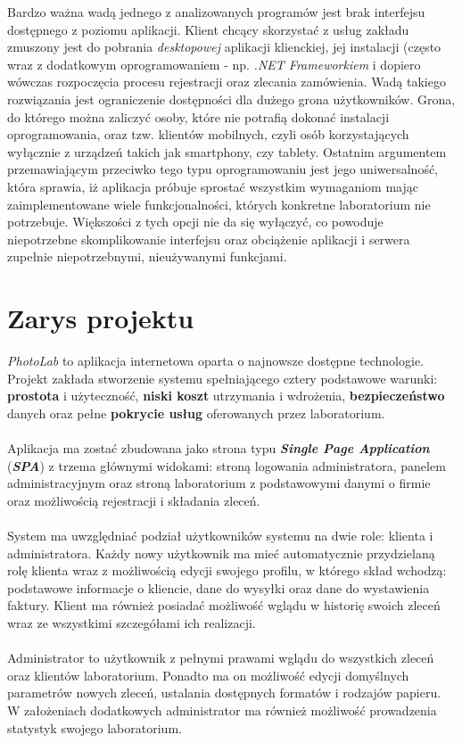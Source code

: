 Bardzo ważna wadą jednego z analizowanych programów jest brak interfejsu dostępnego z poziomu aplikacji. Klient chcący skorzystać z usług zakładu zmuszony jest do pobrania \textit{desktopowej} aplikacji klienckiej, jej instalacji (często wraz z dodatkowym oprogramowaniem - np. \textit{.NET Frameworkiem} i dopiero wówczas rozpoczęcia procesu rejestracji oraz zlecania zamówienia. Wadą takiego rozwiązania jest ograniczenie dostępności dla dużego grona użytkowników. Grona, do którego można zaliczyć osoby, które nie potrafią dokonać instalacji oprogramowania, oraz tzw. klientów mobilnych, czyli osób korzystających wyłącznie z urządzeń takich jak smartphony, czy tablety. Ostatnim argumentem przemawiającym przeciwko tego typu oprogramowaniu jest jego uniwersalność, która sprawia, iż aplikacja próbuje sprostać wszystkim wymaganiom mając zaimplementowane wiele funkcjonalności, których konkretne laboratorium nie potrzebuje. Większości z tych opcji nie da się wyłączyć, co powoduje niepotrzebne skomplikowanie interfejsu oraz obciążenie aplikacji i serwera zupełnie niepotrzebnymi, nieużywanymi funkcjami.


\section{Zarys projektu}

\quad \textit{PhotoLab} to aplikacja internetowa oparta o najnowsze dostępne technologie. Projekt zakłada stworzenie systemu spełniającego cztery podstawowe warunki: \textbf{prostota} i użyteczność, \textbf{niski koszt} utrzymania i wdrożenia, \textbf{bezpieczeństwo} danych oraz pełne \textbf{pokrycie usług} oferowanych przez laboratorium.\\
\\
Aplikacja ma zostać zbudowana jako strona typu \textit{\textbf{Single Page Application}} (\textit{\textbf{SPA}}) z trzema głównymi widokami: stroną logowania administratora, panelem administracyjnym oraz stroną laboratorium z podstawowymi danymi o firmie oraz możliwością rejestracji i składania zleceń.\\
\\
System ma uwzględniać podział użytkowników systemu na dwie role: klienta i administratora.
Każdy nowy użytkownik ma mieć automatycznie przydzielaną rolę klienta wraz z możliwością edycji swojego profilu, w którego skład wchodzą: podstawowe informacje o kliencie, dane do wysyłki oraz dane do wystawienia faktury. Klient ma również posiadać możliwość wglądu w historię swoich zleceń wraz ze wszystkimi szczegółami ich realizacji.\\
\\
Administrator to użytkownik z pełnymi prawami wglądu do wszystkich zleceń oraz klientów laboratorium. Ponadto ma on możliwość edycji domyślnych parametrów nowych zleceń, ustalania dostępnych formatów i rodzajów papieru. W założeniach dodatkowych administrator ma również możliwość prowadzenia statystyk swojego laboratorium.


